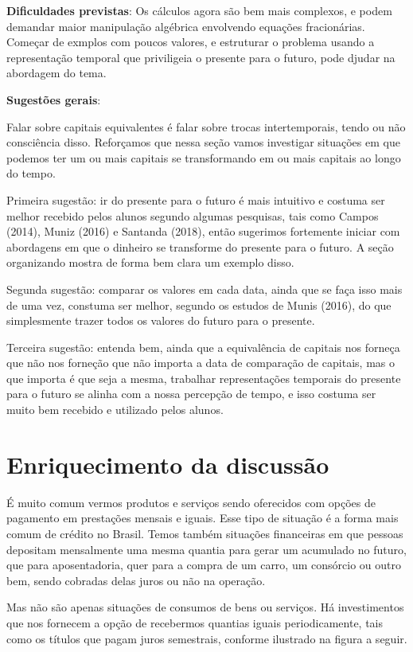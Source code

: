 \begin{paginatexto2}
\textbf{Dificuldades previstas}: Os cálculos agora são bem mais complexos, e podem demandar maior manipulação algébrica envolvendo equações fracionárias. Começar de exmplos com poucos valores, e estruturar o problema usando a representação temporal que priviligeia o presente para o futuro, pode djudar na abordagem do tema.

\textbf{Sugestões gerais}:

Falar sobre capitais equivalentes é falar sobre trocas intertemporais, tendo ou não consciência disso. Reforçamos que nessa seção vamos investigar situações em que podemos ter um ou mais capitais se transformando em ou mais capitais ao longo do tempo.

Primeira sugestão: ir do presente para o futuro é mais intuitivo e costuma ser melhor recebido pelos alunos segundo algumas pesquisas, tais como Campos (2014), Muniz (2016) e Santanda (2018), então sugerimos fortemente iniciar com abordagens em que o dinheiro se transforme do presente para o futuro. A seção organizando mostra de forma bem clara um exemplo disso.

Segunda sugestão: comparar os valores em cada data, ainda que se faça isso mais de uma vez, constuma ser melhor, segundo os estudos de Munis (2016), do que simplesmente trazer todos os valores do futuro para o presente.

Terceira sugestão: entenda bem, ainda que a equivalência de capitais nos forneça que não nos forneção que não importa a data de comparação de capitais, mas o que importa é que seja a mesma, trabalhar representações temporais do presente para o futuro se alinha com a nossa percepção de tempo, e isso costuma ser muito bem recebido e utilizado pelos alunos.

\section{Enriquecimento da discussão}

É muito comum vermos produtos e serviços sendo oferecidos com opções de pagamento em prestações mensais e iguais. Esse tipo de situação é a forma mais comum de crédito no Brasil. Temos também situações financeiras em que pessoas depositam mensalmente uma mesma quantia para gerar um acumulado no futuro, que para aposentadoria, quer para a compra de um carro, um consórcio ou outro bem, sendo cobradas delas juros ou não na operação.

Mas não são apenas situações de consumos de bens ou serviços. Há investimentos que nos fornecem a opção de recebermos quantias iguais periodicamente, tais como os títulos que pagam juros semestrais, conforme ilustrado na figura a seguir.
\end{paginatexto2}

